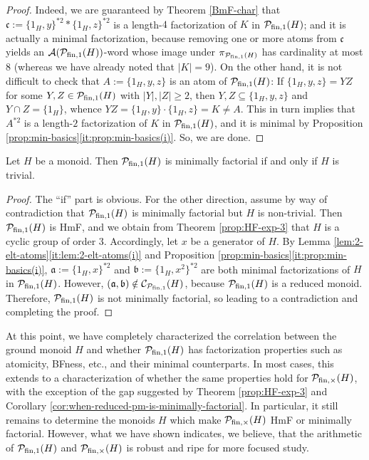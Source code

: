\begin{proof}
	Indeed, we are guaranteed by Theorem \ref{BmF-char} that $\mathfrak c := \{1_H,y\}^{\ast 2} \ast \{1_H,z\}^{\ast 2}$ is a length-$4$ factorization of $K$ in $\mathcal{P}_{\textrm{fin}, 1}(H)$; and it is actually a minimal factorization, because removing one or more atoms from $\mathfrak c$ yields an $\mathcal{A}(\mathcal P_{\textrm{fin}, 1}(H))$-word whose image under $\pi_{\mathcal P_{\textrm{fin}, 1}(H)}$ has cardinality at most $8$ (whereas we have already noted that $|K| = 9$).
	On the other hand, it is not difficult to check that $A := \{1_H, y, z\}$ is an atom of $\mathcal P_{\textrm{fin}, 1}(H)$: If $\{1_H, y, z\} = YZ$ for some $Y, Z \in \mathcal P_{\textrm{fin}, 1}(H)$ with $|Y|, |Z| \ge 2$, then $Y, Z \subseteq \{1_H, y, z\}$ and $Y \cap Z = \{1_H\}$, whence $YZ = \{1_H, y\}\cdot\{1_H, z\} = K \ne A$. This in turn implies that $A^{\ast 2}$ is a length-$2$ factorization of $K$ in $\mathcal{P}_{\textrm{fin}, 1}(H)$, and it is minimal by Proposition \ref{prop:min-basics}\ref{it:prop:min-basics(i)}.
	So, we are done.
\end{proof}

\begin{cor}\label{cor:when-reduced-pm-is-minimally-factorial}
	Let $H$ be a monoid. Then $\mathcal P_{\textrm{fin}, 1}(H)$ is minimally factorial if and only if $H$ is trivial.
\end{cor}

\begin{proof}
	The ``if'' part is obvious. For the other direction, assume by way of contradiction that $\mathcal P_{\textrm{fin}, 1}(H)$ is minimally factorial but $H$ is non-trivial. Then $\mathcal P_{\textrm{fin}, 1}(H)$ is HmF, and we obtain from Theorem \ref{prop:HF-exp-3} that $H$ is a cyclic group of order $3$. Accordingly, let $x$ be a generator of $H$. By Lemma \ref{lem:2-elt-atoms}\ref{it:lem:2-elt-atoms(i)} and Proposition \ref{prop:min-basics}\ref{it:prop:min-basics(i)}, $\mathfrak a := \{1_H, x\}^{\ast 2}$ and $\mathfrak b := \{1_H, x^2\}^{\ast 2}$ are both minimal factorizations of $H$ in $\mathcal P_{\textrm{fin},1}(H)$. However, $(\mathfrak a, \mathfrak b) \notin \mathcal{C}_{\mathcal P_{\textrm{fin}, 1}}(H)$, because $\mathcal P_{\textrm{fin}, 1}(H)$ is a reduced monoid. Therefore, $\mathcal P_{\textrm{fin}, 1}(H)$ is not minimally factorial, so leading to a contradiction and completing the proof.
\end{proof}
%
At this point, we have completely characterized the correlation between the ground monoid $H$ and whether $\mathcal{P}_{\textrm{fin}, 1}(H)$ has factorization properties such as atomicity, BFness, etc., and their minimal counterparts.
In most cases, this extends to a characterization of whether the same properties hold for $\mathcal{P}_{\textrm{fin}, \times}(H)$, with the exception of the gap suggested by Theorem \ref{prop:HF-exp-3} and Corollary \ref{cor:when-reduced-pm-is-minimally-factorial}.
In particular, it still remains to determine the monoids $H$ which make $\mathcal{P}_{\textrm{fin}, \times}(H)$ HmF or minimally factorial.
However, what we have shown indicates, we believe, that the arithmetic of $\mathcal{P}_{\textrm{fin}, 1}(H)$ and $\mathcal{P}_{\textrm{fin}, \times}(H)$ is robust and ripe for more focused study.

